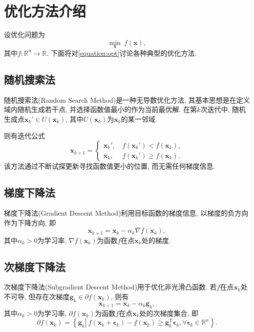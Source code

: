 \section{优化方法介绍}

设优化问题为
\begin{equation}
    \min_{\bm{x}} ~ f(\bm{x}),
    \label{equation:opt}
\end{equation}
其中$f:\mathbb{R}^n\to\mathbb{R}$.
下面将对\cref{equation:opt}讨论各种典型的优化方法.

\subsection{随机搜索法}

随机搜索法(Random Search Method)是一种无导数优化方法, 其基本思想是在定义域内随机生成若干点, 并选择函数值最小的作为当前最优解.
在第$k$次迭代中, 随机生成点$\bm{x}_k'\in U(\bm{x}_k)$, 其中$U(\bm{x}_k)$为$\bm{x}_k$的某一邻域.

则有迭代公式
\begin{equation*}
    \bm{x}_{k+1}=
    \begin{cases}
        \bm{x}_k'\text{, } &f(\bm{x}_k')<f(\bm{x}_k), \\
        \bm{x}_k\text{, } &f(\bm{x}_k')\geq f(\bm{x}_k).
    \end{cases}
\end{equation*}
该方法通过不断试探更新寻找函数值更小的位置, 而无需任何梯度信息.

\subsection{梯度下降法}

梯度下降法(Gradient Descent Method)利用目标函数的梯度信息, 以梯度的负方向作为下降方向, 即
\begin{equation*}
    \bm{x}_{k+1}=\bm{x}_k-\alpha_k\nabla f(\bm{x}_k),
\end{equation*}
其中$\alpha_k>0$为学习率, $\nabla f(\bm{x}_k)$为函数$f$在点$\bm{x}_k$处的梯度.

\subsection{次梯度下降法}

次梯度下降法(Subgradient Descent Method)用于优化非光滑凸函数.
若$f$在点$\bm{x}_k$处不可导, 但存在次梯度$\bm{g}_k\in\partial f(\bm{x}_k)$, 则有
\begin{equation*}
    \bm{x}_{k+1}=\bm{x}_k-\alpha_k\bm{g}_k,
\end{equation*}
其中$\alpha_k>0$为学习率, $\partial f(\bm{x}_k)$为函数$f$在点$\bm{x}_k$处的次梯度集合, 即
\begin{equation*}
    \partial f(\bm{x}_k)=\left\{\bm{g}_k \left| ~ f(\bm{x}_k+\bm{\epsilon}_k)-f(\bm{x}_k)\geq\bm{g}_k^\mathrm{T}\bm{\epsilon}_k, \forall\bm{\epsilon}_k\in\mathbb{R}^n\right.\right\}.
\end{equation*}

